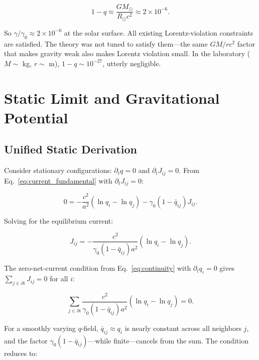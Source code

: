 \documentclass[aps,prd,twocolumn,showpacs,superscriptaddress,preprintnumbers]{revtex4-2}
\begin{document}
\begin{equation}
1 - q \approx \frac{GM_\odot}{R_\odot c^2} \approx 2 \times 10^{-6}.
\label{eq:solar_lv}
\end{equation}

So $\gamma/\gamma_0 \approx 2\times 10^{-6}$ at the solar surface.
All existing Lorentz-violation constraints~\cite{Kostelecky:2008,Mewes:2013} are satisfied.
The theory was not tuned to satisfy them---the same $GM/rc^2$ factor that makes gravity weak also makes Lorentz violation small. In the laboratory ($M\sim$ kg, $r\sim$ m), $1-q\sim 10^{-27}$, utterly negligible.

\section{Static Limit and Gravitational Potential}
\label{sec:static}

\subsection{Unified Static Derivation}

Consider stationary configurations: $\partial_t q=0$ and $\partial_t J_{ij}=0$.
From Eq.~\eqref{eq:current_fundamental} with $\partial_t J_{ij}=0$:

\begin{equation}
0 = -\frac{c^2}{a^2}(\ln q_i - \ln q_j) - \gamma_0(1-\bar{q}_{ij})J_{ij}.
\label{eq:static_J_eq}
\end{equation}

Solving for the equilibrium current:

\begin{equation}
J_{ij} = -\frac{c^2}{\gamma_0(1-\bar{q}_{ij})a^2}(\ln q_i - \ln q_j).
\label{eq:J_static}
\end{equation}

The zero-net-current condition from Eq.~\eqref{eq:continuity} with $\partial_t q_i=0$ gives $\sum_{j\in\partial i}J_{ij}=0$ for all $i$:

\begin{equation}
\sum_{j\in\partial i} \frac{c^2}{\gamma_0(1-\bar{q}_{ij})a^2}(\ln q_i - \ln q_j) = 0.
\label{eq:zero_net_current}
\end{equation}

For a smoothly varying $q$-field, $\bar{q}_{ij}\approx q_i$ is nearly constant across all neighbors $j$, and the factor $\gamma_0(1-\bar{q}_{ij})$---while finite---cancels from the sum.
The condition reduces to:
\end{document}
